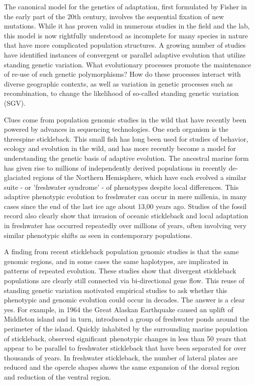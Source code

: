 \documentclass{article}
\begin{document}
The canonical model for the genetics of adaptation, first formulated by Fisher in the early part of the 20th century, involves the sequential fixation of new mutations. While it has proven valid in numerous studies in the field and the lab, this model is now rightfully understood as incomplete for many species in nature that have more complicated population structures. A growing number of studies have identified instances of convergent or parallel adaptive evolution that utilize standing genetic variation. What evolutionary processes promote the maintenance of re-use of such genetic polymorphisms? How do these processes interact with diverse geographic contexts, as well as variation in genetic processes such as recombination, to change the likelihood of so-called standing genetic variation (SGV). 

Clues come from population genomic studies in the wild that have recently been powered by advances in sequencing technologies. One such organism is the threespine stickleback. This small fish has long been used for studies of behavior, ecology and evolution in the wild, and has more recently become a model for understanding the genetic basis of adaptive evolution. The ancestral marine form has given rise to millions of independently derived populations in recently de-glaciated regions of the Northern Hemisphere, which have each evolved a similar suite - or 'freshwater syndrome' - of phenotypes despite local differences. This adaptive phenotypic evolution to freshwater can occur in mere millenia, in many cases since the end of the last ice age about 13,00 years ago. Studies of the fossil record also clearly show that invasion of oceanic stickleback and local adaptation in freshwater has occurred repeatedly over millions of years, often involving very similar phenotypic shifts as seen in contemporary populations.
    
A finding from recent stickleback population genomic studies is that the same genomic regions, and in some cases the same haplotypes, are implicated in patterns of repeated evolution. These studies show that divergent stickleback populations are clearly still connected via bi-directional gene flow. This reuse of standing genetic variation motivated empirical studies to ask whether this phenotypic and genomic evolution could occur in decades. The answer is a clear yes. For example, in 1964 the Great Alaskan Earthquake caused an uplift of Middleton island and in turn, introduced a group of freshwater ponds around the perimeter of the island. Quickly inhabited by the surrounding marine population of stickleback, \citet{lescak2015evolution} observed significant phenotypic changes in less than 50 years that appear to be parallel to freshwater stickleback that have been separated for over thousands of years. In freshwater stickleback, the number of lateral plates are reduced and the opercle shapes shows the same expansion of the dorsal region and reduction of the ventral region.
\end{document}
